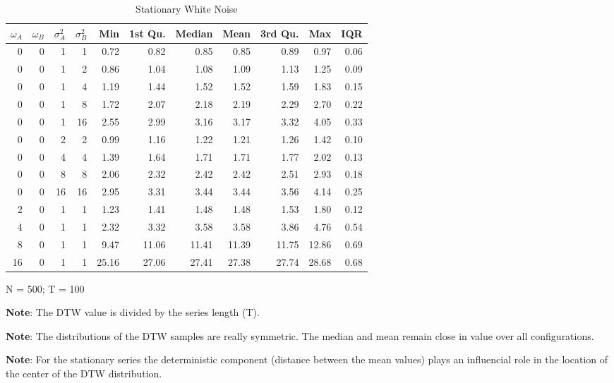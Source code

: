 \documentclass[12pt]{article}
\begin{document}
\begin{table}[!htb]
    \begin{center}
      \begin{tabular}{| r r r r | r r r r r r r |}
        \hline
        $\omega_{A}$ & $\omega_{B}$ & $\sigma^{2}_{A}$ & $\sigma^{2}_{B}$ & Min & 1st Qu. & Median & Mean & 3rd Qu. & Max & IQR \\
        \hline
        0  & 0 & 1  & 1  & 0.72  & 0.82  & 0.85  & 0.85  & 0.89  & 0.97  & 0.06 \\
        \hline
        0  & 0 & 1  & 2  & 0.86  & 1.04  & 1.08  & 1.09  & 1.13  & 1.25  & 0.09 \\
        0  & 0 & 1  & 4  & 1.19  & 1.44  & 1.52  & 1.52  & 1.59  & 1.83  & 0.15 \\
        0  & 0 & 1  & 8  & 1.72  & 2.07  & 2.18  & 2.19  & 2.29  & 2.70  & 0.22 \\
        0  & 0 & 1  & 16 & 2.55  & 2.99  & 3.16  & 3.17  & 3.32  & 4.05  & 0.33 \\
        \hline
        0  & 0 & 2  & 2  & 0.99  & 1.16  & 1.22  & 1.21  & 1.26  & 1.42  & 0.10 \\
        0  & 0 & 4  & 4  & 1.39  & 1.64  & 1.71  & 1.71  & 1.77  & 2.02  & 0.13 \\
        0  & 0 & 8  & 8  & 2.06  & 2.32  & 2.42  & 2.42  & 2.51  & 2.93  & 0.18 \\
        0  & 0 & 16 & 16 & 2.95  & 3.31  & 3.44  & 3.44  & 3.56  & 4.14  & 0.25 \\
        \hline
        2  & 0 & 1  & 1  &  1.23 &  1.41 &  1.48 &  1.48 &  1.53 &  1.80 & 0.12 \\
        4  & 0 & 1  & 1  &  2.32 &  3.32 &  3.58 &  3.58 &  3.86 &  4.76 & 0.54 \\
        8  & 0 & 1  & 1  &  9.47 & 11.06 & 11.41 & 11.39 & 11.75 & 12.86 & 0.69 \\
        16 & 0 & 1  & 1  & 25.16 & 27.06 & 27.41 & 27.38 & 27.74 & 28.68 & 0.68 \\
        \hline
      \end{tabular}
    \caption{Stationary White Noise}
    \end{center}
    \begin{tablenotes}
        \item{\footnotesize N = 500; T = 100}
        \item {\footnotesize \textbf{Note}: The DTW value is divided by the series length (T).}
        \item {\footnotesize \textbf{Note}: The distributions of the DTW samples are really symmetric. The median and mean remain close in value over all configurations.}
        \item{\footnotesize \textbf{Note}: For the stationary series the deterministic component (distance between the mean values) plays an influencial role in the location of the center of the DTW distribution.}
    \end{tablenotes}
    \label{tbl:dtw_white_noise}
\end{table}
\end{document}
